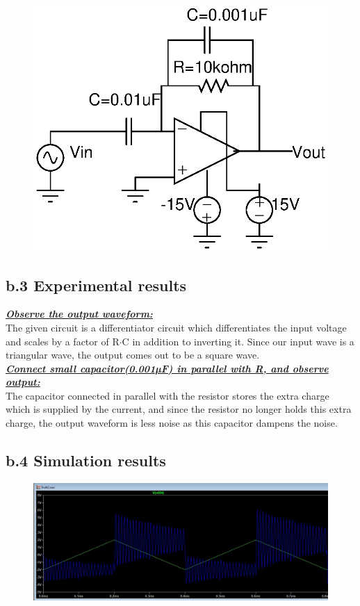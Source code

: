 \documentclass[12pt]{article}
\begin{document}
\begin{figure}[h!]
\centering
\includegraphics[scale = 1]{Exp_1_b_2.eps}
\end{figure}

\newpage
\subsection*{b.3 Experimental results}

\textbf{\underline{\textit{Observe the output waveform:}}}\\
The given circuit is a differentiator circuit which differentiates the input voltage and scales by a factor of R$\cdot$C in addition to inverting it. Since our input wave is a triangular wave, the output comes out to be a square wave. \\

\!\!\!\!\!\!\!\!\!\textbf{\underline{\textit{Connect small capacitor(0.001µF) in parallel with R, and observe output:}}}\\
The capacitor connected in parallel with the resistor stores the extra charge which is supplied by the current, and since the resistor no longer holds this extra charge, the output waveform is less noise as this capacitor dampens the noise.\\
\newpage
\subsection*{b.4 Simulation results}%
\begin{figure}[h!]
\centering
\includegraphics[scale = 0.4]{Sim_1_b_1.jpg}
\end{figure}
\end{document}
